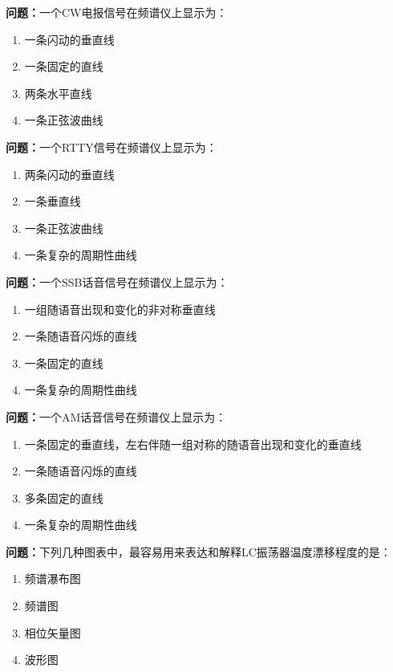 \bigskip


\noindent\textbf{问题：}一个CW电报信号在频谱仪上显示为：
\begin{enumerate}[label=\Alph*), leftmargin=3em]
\item 一条闪动的垂直线
\item 一条固定的直线
\item 两条水平直线
\item 一条正弦波曲线
\end{enumerate}

\bigskip


\noindent\textbf{问题：}一个RTTY信号在频谱仪上显示为：
\begin{enumerate}[label=\Alph*), leftmargin=3em]
\item 两条闪动的垂直线
\item 一条垂直线
\item 一条正弦波曲线
\item 一条复杂的周期性曲线
\end{enumerate}

\bigskip


\noindent\textbf{问题：}一个SSB话音信号在频谱仪上显示为：
\begin{enumerate}[label=\Alph*), leftmargin=3em]
\item 一组随语音出现和变化的非对称垂直线
\item 一条随语音闪烁的直线
\item 一条固定的直线
\item 一条复杂的周期性曲线
\end{enumerate}

\bigskip


\noindent\textbf{问题：}一个AM话音信号在频谱仪上显示为：
\begin{enumerate}[label=\Alph*), leftmargin=3em]
\item 一条固定的垂直线，左右伴随一组对称的随语音出现和变化的垂直线
\item 一条随语音闪烁的直线
\item 多条固定的直线
\item 一条复杂的周期性曲线
\end{enumerate}

\bigskip


\noindent\textbf{问题：}下列几种图表中，最容易用来表达和解释LC振荡器温度漂移程度的是：
\begin{enumerate}[label=\Alph*), leftmargin=3em]
\item 频谱瀑布图
\item 频谱图
\item 相位矢量图
\item 波形图
\end{enumerate}

